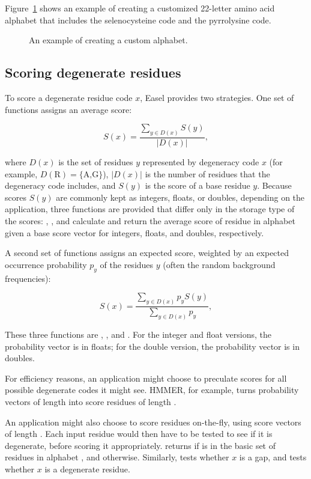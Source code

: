 Figure~\ref{fig:alphabet_example2} shows an example of creating a
customized 22-letter amino acid alphabet that includes the 
selenocysteine code and the  pyrrolysine code.

\begin{figure}

\caption{An example of creating a custom alphabet.}
\label{fig:alphabet_example2}
\end{figure}



\subsection{Scoring degenerate residues}

To score a degenerate residue code $x$, Easel provides two strategies.
One set of functions assigns an average score:

\[
  S(x) =  \frac{\sum_{y \in D(x)}  S(y) } { |D(x)| },
\]

where $D(x)$ is the set of residues $y$ represented by degeneracy code
$x$ (for example, $D(\mbox{R}) = \{ \mbox{A,G} \}$), $| D(x) |$ is the
number of residues that the degeneracy code includes, and $S(y)$ is
the score of a base residue $y$. Because scores $S(y)$ are commonly
kept as integers, floats, or doubles, depending on the application,
three functions are provided that differ only in the storage type of
the scores: ,
, and
 calculate and return the average
score of residue  in alphabet  given a base score
vector  for integers, floats, and doubles,
respectively.

A second set of functions assigns an expected score, weighted by an
expected occurrence probability $p_y$ of the residues $y$ (often the
random background frequencies):

\[
  S(x) =  \frac{\sum_{y \in D(x)}  p_y S(y) } { \sum_{y \in D(x)} p_y },
\]

These three functions are ,
, and
.  For the integer and float
versions, the probability vector is in floats; for the double version,
the probability vector is in doubles.

For efficiency reasons, an application might choose to preculate
scores for all possible degenerate codes it might see. HMMER, for
example, turns probability vectors of length  into score
residues of length .

An application might also choose to score residues on-the-fly, using
score vectors of length . Each input residue  would
then have to be tested to see if it is degenerate, before scoring it
appropriately.   returns 
if  is in the basic set of  residues in alphabet
, and  otherwise. Similarly,
 tests whether $x$ is a gap, and
 tests whether $x$ is a degenerate
residue.

